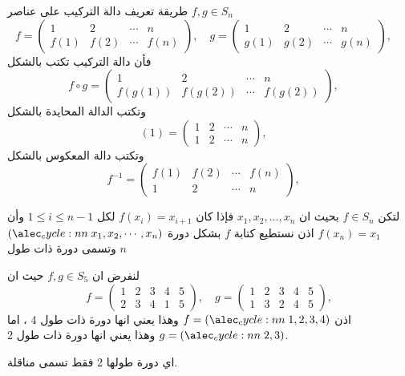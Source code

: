 \begin{note}
	طريقة تعريف دالة التركيب على عناصر $f, g\in S_n$ 
	\[
	f = \begin{pmatrix}
		1&2&\cdots&n\\
		f(1)&f(2)&\cdots&f(n)
	\end{pmatrix}, \quad 
	g = \begin{pmatrix}
	1&2&\cdots&n\\
	g(1)&g(2)&\cdots&g(n)
\end{pmatrix}, \quad 
	\]
	فأن دالة التركيب تكتب بالشكل
	\[
		f\circ g = \begin{pmatrix}
		1&2&\cdots&n\\
		f(g(1))&f(g(2))&\cdots&f(g(2))
	\end{pmatrix}, \quad 
	\]
	وتكتب الدالة المحايدة بالشكل
	\[
		(1)= \begin{pmatrix}
		1&2&\cdots&n\\
		1&2&\cdots&n
	\end{pmatrix}, \quad 
	\]
	وتكتب دالة المعكوس بالشكل
	\[
	f^{-1}=
		 \begin{pmatrix}
		f(1)&f(2)&\cdots&f(n)\\
				1&2&\cdots&n
	\end{pmatrix}, \quad 
	\]
\end{note}

\begin{definition}
	لتكن $f\in S_n$ بحيث ان $x_1, x_2, \dots, x_n$ فإذا كان $f(x_i) = x_{i+1}$ لكل $1\leq i\leq n-1$ وأن $f(x_n)=x_1$ اذن نستطيع كتابة $f$ بشكل دورة $\cycle{x_1, x_2, \cdots, x_n}$ وتسمى دورة ذات طول  $n$ 
\end{definition}

\begin{example}
	لنفرض ان $f, g\in S_5$ حيث ان
	\[
	f = \begin{pmatrix}
		1&2&3&4&5\\
		2&3&4&1&5
	\end{pmatrix}, \quad
		g = \begin{pmatrix}
		1&2&3&4&5\\
		1&3&2&4&5
	\end{pmatrix}, 
	\]
	اذن $f=\cycle{1,2,3,4}$ وهذا يعني انها دورة ذات طول 4 ، اما $g=\cycle{2,3}$ وهذا يعني انها دورة ذات طول 2.
\end{example}

\begin{definition}
	اي دورة طولها 2 فقط تسمى مناقلة.
\end{definition}

